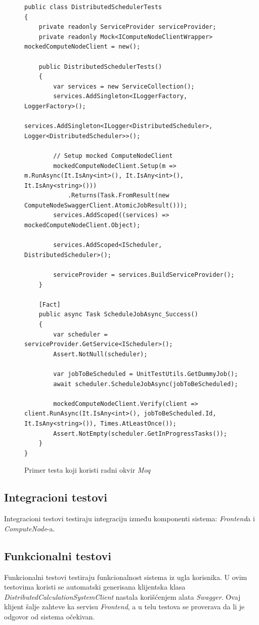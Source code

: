 \documentclass[12pt,oneside]{memoir}
\begin{document}
\begin{figure}[h!]
\centering
\begin{lstlisting}
public class DistributedSchedulerTests
{
	private readonly ServiceProvider serviceProvider;
	private readonly Mock<IComputeNodeClientWrapper> mockedComputeNodeClient = new();

	public DistributedSchedulerTests()
	{
		var services = new ServiceCollection();
		services.AddSingleton<ILoggerFactory, LoggerFactory>();
		services.AddSingleton<ILogger<DistributedScheduler>, Logger<DistributedScheduler>>();

		// Setup mocked ComputeNodeClient
		mockedComputeNodeClient.Setup(m => m.RunAsync(It.IsAny<int>(), It.IsAny<int>(), It.IsAny<string>()))
			.Returns(Task.FromResult(new ComputeNodeSwaggerClient.AtomicJobResult()));
		services.AddScoped((services) => mockedComputeNodeClient.Object);

		services.AddScoped<IScheduler, DistributedScheduler>();

		serviceProvider = services.BuildServiceProvider();
	}

	[Fact]
	public async Task ScheduleJobAsync_Success()
	{
		var scheduler = serviceProvider.GetService<IScheduler>();
		Assert.NotNull(scheduler);

		var jobToBeScheduled = UnitTestUtils.GetDummyJob();
		await scheduler.ScheduleJobAsync(jobToBeScheduled);

		mockedComputeNodeClient.Verify(client => client.RunAsync(It.IsAny<int>(), jobToBeScheduled.Id, It.IsAny<string>()), Times.AtLeastOnce());
		Assert.NotEmpty(scheduler.GetInProgressTasks());
	}
}
\end{lstlisting}
\caption{Primer testa koji koristi radni okvir \emph{Moq}}
\label{fig:testscheduler}
\end{figure}

\subsection{Integracioni testovi}
Integracioni testovi testiraju integraciju između komponenti sistema: \emph{Frontend}a i \emph{ComputeNode}-a.

\subsection{Funkcionalni testovi}
Funkcionalni testovi testiraju funkcionalnost sistema iz ugla korisnika. U ovim testovima koristi se automatski generisana klijentska klasa \emph{DistributedCalculationSystemClient} nastala korišćenjem alata \emph{Swagger}. Ovaj klijent šalje zahteve ka servisu \emph{Frontend}, a u telu testova se proverava da li je odgovor od sistema očekivan.
\end{document}
